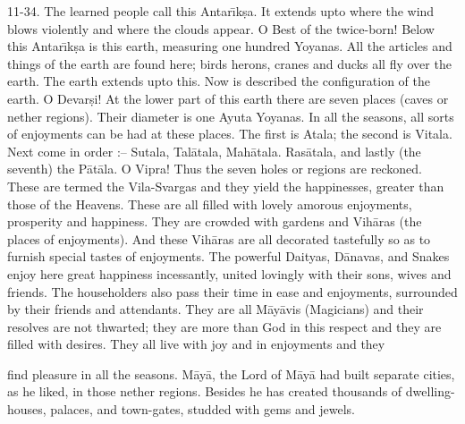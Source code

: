 11-34. The learned people call this Antar\={\i}k\d{s}a. It extends upto where the wind blows violently and where the clouds appear. O Best of the twice-born! Below this Antar\={\i}k\d{s}a is this earth, measuring one hundred Yoyanas. All the articles and things of the earth are found here; birds herons, cranes and ducks all fly over the earth. The earth extends upto this. Now is described the configuration of the earth. O Devar\d{s}i! At the lower part of this earth there are seven places (caves or nether regions). Their diameter is one Ayuta Yoyanas. In all the seasons, all sorts of enjoyments can be had at these places. The first is Atala; the second is Vitala. Next come in order :-- Sutala, Tal\=atala, Mah\=atala. Ras\=atala, and lastly (the seventh) the P\=at\=ala. O Vipra! Thus the seven holes or regions are reckoned. These are termed the Vila-Svargas and they yield the happinesses, greater than those of the Heavens. These are all filled with lovely amorous enjoyments, prosperity and happiness. They are crowded with gardens and Vih\=aras (the places of enjoyments). And these Vih\=aras are all decorated tastefully so as to furnish special tastes of enjoyments. The powerful Daityas, D\=anavas, and Snakes enjoy here great happiness incessantly, united lovingly with their sons, wives and friends. The householders also pass their time in ease and enjoyments, surrounded by their friends and attendants. They are all M\=ay\=avis (Magicians) and their resolves are not thwarted; they are more than God in this respect and they are filled with desires. They all live with joy and in enjoyments and they

find pleasure in all the seasons. M\=ay\=a, the Lord of M\=ay\=a had built separate cities, as he liked, in those nether regions. Besides he has created thousands of dwelling-houses, palaces, and town-gates, studded with gems and jewels.

